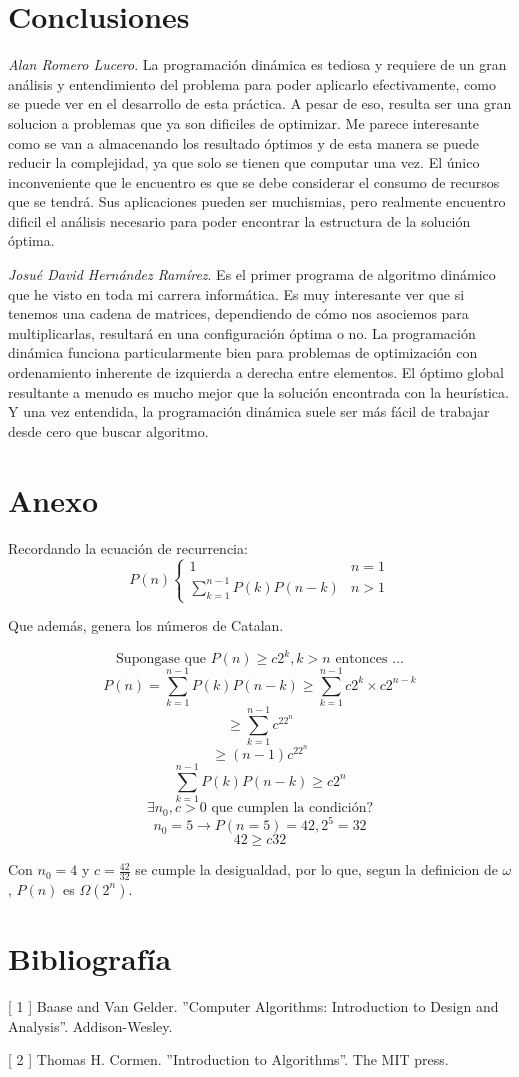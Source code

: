 \documentclass[12pt,twoside]{article}
\begin{document}
\section{Conclusiones}

\textit{Alan Romero Lucero}. La programaci\'on din\'amica es tediosa y requiere de un gran an\'alisis y entendimiento del problema para poder aplicarlo efectivamente, como se puede ver en el desarrollo de esta pr\'actica. A pesar de eso, resulta ser una gran solucion a problemas que ya son dificiles de optimizar. Me parece interesante como se van a almacenando los resultado \'optimos y de esta manera se puede reducir la complejidad, ya que solo se tienen que computar una vez. El \'unico inconveniente que le encuentro es que se debe considerar el consumo de recursos que se tendr\'a. Sus aplicaciones pueden ser muchismias, pero realmente encuentro dificil el an\'alisis necesario para poder encontrar la estructura de la soluci\'on \'optima.


\textit{Josu\'e David Hern\'andez Ram\'irez}.
Es el primer programa de algoritmo dinámico que he visto en toda mi carrera informática. Es muy interesante ver que si tenemos una cadena de matrices, dependiendo de cómo nos asociemos para multiplicarlas, resultará en una configuraci\'on \'optima o no. La programaci\'on dinámica funciona particularmente bien para problemas de optimizaci\'on con ordenamiento inherente de izquierda a derecha entre elementos. El \'optimo global resultante a menudo es mucho mejor que la soluci\'on encontrada con la heur\'istica. Y una vez entendida, la programaci\'on din\'amica suele ser más f\'acil de trabajar desde cero que buscar algoritmo.

\section{Anexo}

Recordando la ecuaci\'on de recurrencia:
\[
    P(n)
    \begin{cases}
        1 & n=1 \\
        \sum_{k=1}^{n-1} P(k)P(n-k) & n>1
    \end{cases}
\]

Que adem\'as, genera los n\'umeros de Catalan.

\[
    \text{Supongase que } P(n) \geq c2^k, k > n \text{ entonces } \dots 
\]
\[
    P(n) = \sum_{k=1}^{n-1} P(k)P(n-k) \geq \sum_{k=1}^{n-1} c2^k \times c2^{n-k} 
\]
\[
    \geq \sum_{k=1}^{n-1} c^22^{n}
\]
\[
    \geq (n-1) c^22^{n}
\]
\[
    \sum_{k=1}^{n-1} P(k)P(n-k) \geq c2^{n}
\]
\[
    \exists n_0,c > 0 \text{ que cumplen la condici\'on?}
\]
\[
    n_0 = 5 \longrightarrow P(n = 5) = 42, 2^5 = 32
\]
\[
    42 \geq c32
\]

Con $n_0 = 4$ y $c = \frac{42}{32}$ se cumple la desigualdad, por lo que, segun la definicion de $ \omega $ , $P(n)$ es $\Omega(2^n)$.


\section{Bibliograf\'ia}
[ 1 ] Baase and Van Gelder. ”Computer Algorithms: Introduction to Design and Analysis”. Addison-Wesley.

[ 2 ] Thomas H. Cormen. ”Introduction to Algorithms”. The MIT press.
\end{document}
